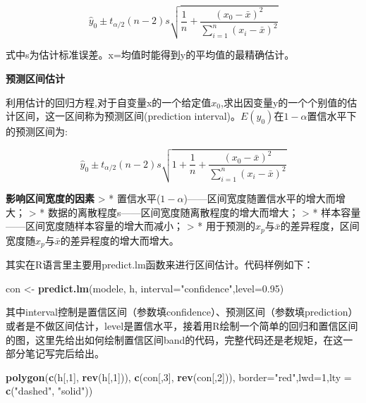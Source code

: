 \documentclass[]{ctexbook}
\newenvironment{Shaded}{\begin{snugshade}}{\end{snugshade}}
\newcommand{\DataTypeTok}[1]{\textcolor[rgb]{0.13,0.29,0.53}{#1}}
\newcommand{\DecValTok}[1]{\textcolor[rgb]{0.00,0.00,0.81}{#1}}
\newcommand{\FloatTok}[1]{\textcolor[rgb]{0.00,0.00,0.81}{#1}}
\newcommand{\KeywordTok}[1]{\textcolor[rgb]{0.13,0.29,0.53}{\textbf{#1}}}
\newcommand{\NormalTok}[1]{#1}
\newcommand{\StringTok}[1]{\textcolor[rgb]{0.31,0.60,0.02}{#1}}
\begin{document}
\[\hat y_0\pm t_{\alpha/2}(n-2)s\sqrt{\frac{1}{n}+\frac{(x_0-\bar x)^2}{\sum_{i=1}^n(x_i-\bar x)^2}}\]

式中s为估计标准误差。x=均值时能得到y的平均值的最精确估计。

\textbf{预测区间估计}

利用估计的回归方程,对于自变量x的一个给定值\(x_0\),求出因变量y的一个个别值的估计区间，这一区间称为预测区间(prediction interval)。\(E(y_0)\)在\(1-\alpha\)置信水平下的预测区间为:

\[\hat y_0\pm t_{\alpha/2}(n-2)s\sqrt{1+\frac{1}{n}+\frac{(x_0-\bar x)^2}{\sum_{i=1}^n(x_i-\bar x)^2}}\]

\textbf{影响区间宽度的因素}
\textgreater{} * 置信水平(\(1-\alpha\))------区间宽度随置信水平的增大而增大；
\textgreater{} * 数据的离散程度s------区间宽度随离散程度的增大而增大；
\textgreater{} * 样本容量------区间宽度随样本容量的增大而减小；
\textgreater{} * 用于预测的\(x_p\)与\(\bar x\)的差异程度，区间宽度随\(x_p\)与\(\bar x\)的差异程度的增大而增大。

其实在R语言里主要用predict.lm函数来进行区间估计。代码样例如下：

\begin{Shaded}
\begin{Highlighting}[]
\NormalTok{con <-}\StringTok{ }\KeywordTok{predict.lm}\NormalTok{(modele, h, }\DataTypeTok{interval=}\StringTok{"confidence"}\NormalTok{,}\DataTypeTok{level=}\FloatTok{0.95}\NormalTok{)}
\end{Highlighting}
\end{Shaded}

其中interval控制是置信区间（参数填confidence）、预测区间（参数填prediction）或者是不做区间估计，level是置信水平，接着用R绘制一个简单的回归和置信区间的图，这里先给出如何绘制置信区间band的代码，完整代码还是老规矩，在这一部分笔记写完后给出。

\begin{Shaded}
\begin{Highlighting}[]
\KeywordTok{polygon}\NormalTok{(}\KeywordTok{c}\NormalTok{(h[,}\DecValTok{1}\NormalTok{], }\KeywordTok{rev}\NormalTok{(h[,}\DecValTok{1}\NormalTok{])), }\KeywordTok{c}\NormalTok{(con[,}\DecValTok{3}\NormalTok{], }\KeywordTok{rev}\NormalTok{(con[,}\DecValTok{2}\NormalTok{])), }\DataTypeTok{border=}\StringTok{"red"}\NormalTok{,}\DataTypeTok{lwd=}\DecValTok{1}\NormalTok{,}\DataTypeTok{lty =} \KeywordTok{c}\NormalTok{(}\StringTok{"dashed"}\NormalTok{, }\StringTok{"solid"}\NormalTok{))}
\end{Highlighting}
\end{Shaded}
\end{document}
